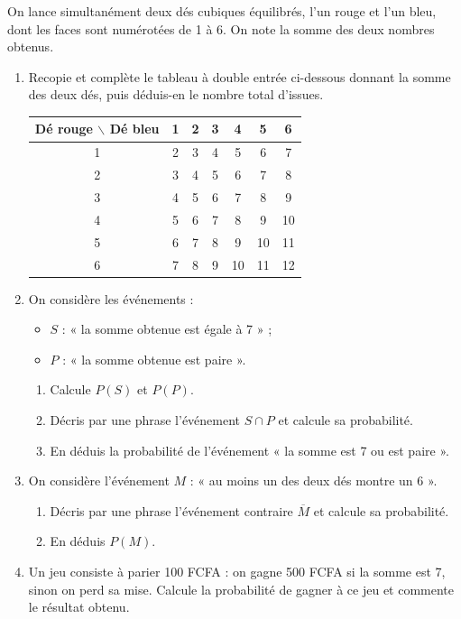 \documentclass[11pt]{article}
\begin{document}
\begin{exercice}
On lance simultanément deux dés cubiques équilibrés, l'un rouge et l'un bleu, dont les faces sont numérotées de 1 à 6. On note la somme des deux nombres obtenus.
\begin{enumerate}
\item Recopie et complète le tableau à double entrée ci-dessous donnant la somme des deux dés, puis déduis-en le nombre total d'issues.
\begin{center}
\begin{tabular}{|c|c|c|c|c|c|c|}
\hline
\rowcolor{popblueL} Dé rouge $\backslash$ Dé bleu & 1 & 2 & 3 & 4 & 5 & 6 \\
\hline
1 & 2 & 3 & 4 & 5 & 6 & 7 \\
\hline
2 & 3 & 4 & 5 & 6 & 7 & 8 \\
\hline
3 & 4 & 5 & 6 & 7 & 8 & 9 \\
\hline
4 & 5 & 6 & 7 & 8 & 9 & 10 \\
\hline
5 & 6 & 7 & 8 & 9 & 10 & 11 \\
\hline
6 & 7 & 8 & 9 & 10 & 11 & 12 \\
\hline
\end{tabular}
\end{center}
\item On considère les événements :
\begin{itemize}
\item $S$ : « la somme obtenue est égale à 7 » ;
\item $P$ : « la somme obtenue est paire ».
\end{itemize}
\begin{enumerate}
\item Calcule $P(S)$ et $P(P)$.
\item Décris par une phrase l'événement $S \cap P$ et calcule sa probabilité.
\item En déduis la probabilité de l'événement « la somme est 7 ou est paire ».
\end{enumerate}
\item On considère l'événement $M$ : « au moins un des deux dés montre un 6 ».
\begin{enumerate}
\item Décris par une phrase l'événement contraire $\overline{M}$ et calcule sa probabilité.
\item En déduis $P(M)$.
\end{enumerate}
\item Un jeu consiste à parier 100 FCFA : on gagne 500 FCFA si la somme est 7, sinon on perd sa mise. Calcule la probabilité de gagner à ce jeu et commente le résultat obtenu.
\end{enumerate}
\end{exercice}
\end{document}
